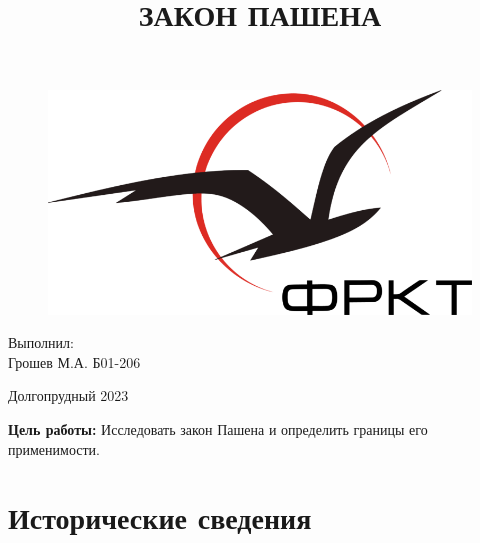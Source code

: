 \documentclass[a4paper, 12pt]{article}
\title{ЗАКОН ПАШЕНА}
\date{}
\begin{document}

    \begin{titlepage}
    \maketitle
    \thispagestyle{empty}

            \begin{figure}[h]
            \centering
            \includegraphics[scale=1.3]{./pics/rt.png}
            \end{figure}

             \vspace{15em}
             \begin{flushright}
                 \normalsize Выполнил:\\
                             Грошев М.А. Б01-206
             \end{flushright}

             \begin{center}
                    \vfill \normalsize Долгопрудный 2023
             \end{center}
    \end{titlepage}


\newpage
\setcounter{page}{1}

\textbf{Цель работы:}  Исследовать закон Пашена и определить границы его применимости.\\


\section{Исторические сведения}
\end{document}
